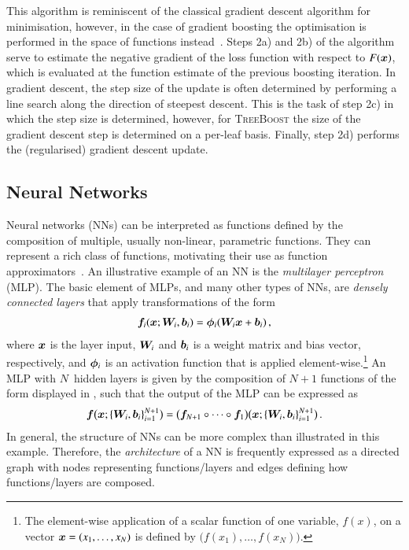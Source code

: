 This algorithm is reminiscent of the classical gradient descent algorithm for
minimisation, however, in the case of gradient boosting the optimisation is
performed in the space of functions instead~\cite{Friedman:2001wbq}. Steps 2a)
and 2b) of the algorithm serve to estimate the negative gradient of the loss
function with respect to $F(\bm{x})$, which is evaluated at the function
estimate of the previous boosting iteration. In gradient descent, the step size
of the update is often determined by performing a line search along the
direction of steepest descent. This is the task of step 2c) in which the step
size is determined, however, for \textsc{TreeBoost} the size of the gradient
descent step is determined on a per-leaf basis. Finally, step 2d) performs the
(regularised) gradient descent update.


\subsection{Neural Networks}%
\label{sec:neural_networks}

Neural networks (NNs) can be interpreted as functions defined by the composition
of multiple, usually non-linear, parametric functions. They can represent a rich
class of functions, motivating their use as function
approximators~\cite{hornik1989multilayer}. An illustrative example of an NN is
the \emph{multilayer perceptron} (MLP). The basic element of MLPs, and many
other types of NNs, are \emph{densely connected layers} that apply
transformations of the form
\begin{align}
  \bm{f}_i(\bm{x}; \bm{W}_i, \bm{b}_i) = \bm{\phi}_i(\bm{W}_i \bm{x} + \bm{b}_i) \,\text{,}
  \label{eq:dense_layer}
\end{align}
where $\bm{x}$ is the layer input, $\bm{W}_i$ and $\bm{b}_i$ is a
weight matrix and bias vector, respectively, and $\bm{\phi}_i$ is an
activation function that is applied element-wise.\footnote{The element-wise
  application of a scalar function of one variable, $f(x)$, on a vector
  $\bm{x} = (x_1, \dots, x_N)$ is defined by
  $\bigl( f(x_1), \dots, f(x_N) \bigr)$.} An MLP with $N$~hidden layers is given
by the composition of $N + 1$ functions of the form displayed in
, such that the output of the MLP can be expressed as
\begin{align*}
  \bm{f}\bigl( \bm{x}; \{\bm{W}_{i},\bm{b}_{i} \}_{i=1}^{N+1} \bigr)
  = \bigl( \bm{f}_{N+1} \circ \dots \circ \bm{f}_{1} \bigr)
  \bigl( \bm{x}; \{\bm{W}_i, \bm{b}_i\}_{i=1}^{N+1} \bigr)
  \,\text{.}
\end{align*}
In general, the structure of NNs can be more complex than illustrated in this
example. Therefore, the \emph{architecture} of a NN is frequently expressed as a
directed graph with nodes representing functions/layers and edges defining how
functions/layers are composed.


